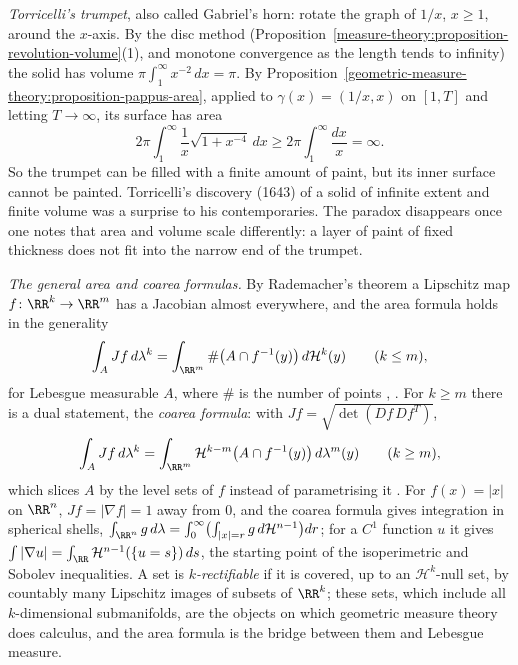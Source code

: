 \begin{counterexample}\label{geometric-measure-theory:counterexample-gabriel-horn}
\emph{Torricelli's trumpet}, also called Gabriel's horn: rotate the graph of $1/x$, $x \geq 1$, around the $x$-axis. By the disc method (Proposition~\ref{measure-theory:proposition-revolution-volume}(1), and monotone convergence
as the length tends to infinity) the solid has volume $\pi\int_1^\infty x^{-2}\,dx = \pi$. By Proposition~\ref{geometric-measure-theory:proposition-pappus-area}, applied to $\gamma(x) = (1/x, x)$ on $[1, T]$ and letting $T \to \infty$,
its surface has area
\[
2\pi\int_1^\infty\frac1x\sqrt{1 + x^{-4}}\,dx \geq 2\pi\int_1^\infty\frac{dx}{x} = \infty .
\]
So the trumpet can be filled with a finite amount of paint, but its inner surface cannot be painted. Torricelli's discovery (1643) of a solid of infinite extent and finite volume was a surprise to his
contemporaries. The paradox disappears once one notes that area and volume scale differently: a layer of paint of fixed thickness does not fit into the narrow end of the trumpet.
\end{counterexample}

\begin{remark}\label{geometric-measure-theory:remark-area-coarea}
\emph{The general area and coarea formulas.} By Rademacher's theorem a Lipschitz map $f \colon \RR^k \to \RR^m$ has a Jacobian almost everywhere, and the area formula holds in the generality
\[
\int_AJf\,d\lambda^k = \int_{\RR^m}\#\bigl(A \cap f^{-1}(y)\bigr)\,d\mathcal{H}^k(y) \qquad (k \leq m),
\]
for Lebesgue measurable $A$, where $\#$ is the number of points \cite[Section 3.3]{evans-gariepy}, \cite[Section 3.2]{federer-gmt}. For $k \geq m$ there is a dual statement, the \emph{coarea
formula}: with $Jf = \sqrt{\det(Df\,Df^T)}$,
\[
\int_AJf\,d\lambda^k = \int_{\RR^m}\mathcal{H}^{k-m}\bigl(A \cap f^{-1}(y)\bigr)\,d\lambda^m(y) \qquad (k \geq m),
\]
which slices $A$ by the level sets of $f$ instead of parametrising it \cite[Section 3.4]{evans-gariepy}. For $f(x) = |x|$ on $\RR^n$, $Jf = |\nabla f| = 1$ away from $0$, and the coarea formula
gives integration in spherical shells, $\int_{\RR^n}g\,d\lambda = \int_0^\infty\bigl(\int_{|x| = r}g\,d\mathcal{H}^{n-1}\bigr)dr$; for a $C^1$ function $u$ it gives $\int|\nabla u| =
\int_\RR\mathcal{H}^{n-1}(\{u = s\})\,ds$, the starting point of the isoperimetric and Sobolev inequalities. A set is \emph{$k$-rectifiable} if it is covered, up to an $\mathcal{H}^k$-null set,
by countably many Lipschitz images of subsets of $\RR^k$; these sets, which include all $k$-dimensional submanifolds, are the objects on which geometric measure theory does calculus, and
the area formula is the bridge between them and Lebesgue measure.
\end{remark}


